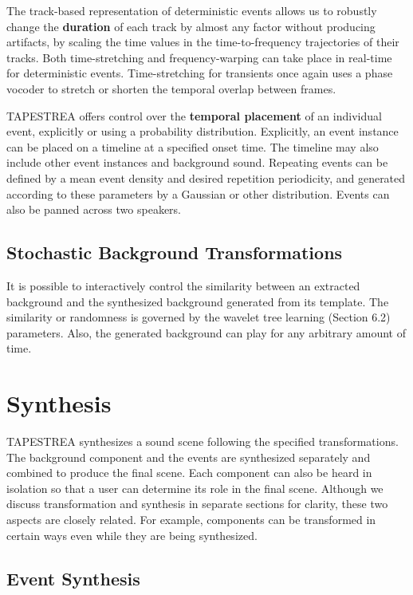 \documentclass[twoside]{article}
\begin{document}
The track-based representation of deterministic events allows us 
to robustly change the \textbf{duration} of each track by almost any factor without 
producing artifacts, by scaling the time values in the time-to-frequency trajectories of their tracks. 
Both time-stretching and frequency-warping can take place in 
real-time for deterministic events. Time-stretching for transients once again uses a phase 
vocoder to stretch or shorten the temporal overlap between frames.  

TAPESTREA offers control over the \textbf{temporal placement} of an individual event, 
explicitly or using a probability distribution. 
Explicitly, an event instance can be placed on a timeline at a specified onset time. The timeline 
may also include other event instances and background sound. Repeating events can be defined by a mean 
event density and desired repetition periodicity, and generated according to these parameters by a Gaussian or other 
distribution. Events can also be panned across two speakers. 

\subsection{Stochastic Background Transformations}

It is possible to interactively control the similarity between an extracted background 
and the synthesized background generated from its template.
The similarity or randomness is governed by the wavelet 
tree learning (Section 6.2) parameters. Also, the generated background 
can play for any arbitrary amount of time.

\section{Synthesis}

TAPESTREA synthesizes a sound scene following the specified transformations. The background 
component and the events are synthesized separately and combined to produce the 
final scene. Each component can also be heard in isolation so that a user can determine its 
role in the final scene. Although we discuss transformation and synthesis in separate sections for 
clarity, these two aspects are closely related. For example, components can be 
transformed in certain ways even while they are being synthesized. 

\subsection{Event Synthesis}
\end{document}

